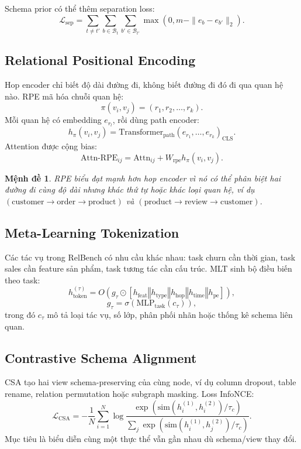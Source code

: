 \documentclass[12pt,a4paper]{article}
\newtheorem{proposition}{Mệnh đề}[section]
\newcommand{\concat}{\mathbin{\Vert}}
\begin{document}
Schema prior có thể thêm separation loss:
\[
  \mathcal{L}_\text{sep}=
  \sum_{t\ne t'}\sum_{b\in\mathcal{B}_t}\sum_{b'\in\mathcal{B}_{t'}}
  \max(0,m-\|e_b-e_{b'}\|_2).
\]

\subsection{Relational Positional Encoding}

Hop encoder chỉ biết độ dài đường đi, không biết đường đi đó đi qua quan hệ
nào. RPE mã hóa chuỗi quan hệ:
\[
  \pi(v_i,v_j)=(r_1,r_2,\ldots,r_k).
\]
Mỗi quan hệ có embedding $e_{r_l}$, rồi dùng path encoder:
\[
  h_\pi(v_i,v_j)=
  \text{Transformer}_\text{path}(e_{r_1},\ldots,e_{r_k})_{\text{CLS}}.
\]
Attention được cộng bias:
\[
  \text{Attn-RPE}_{ij}=\text{Attn}_{ij}+W_\text{rpe}h_\pi(v_i,v_j).
\]

\begin{proposition}
RPE biểu đạt mạnh hơn hop encoder vì nó có thể phân biệt hai đường đi cùng
độ dài nhưng khác thứ tự hoặc khác loại quan hệ, ví dụ
$(\text{customer}\rightarrow\text{order}\rightarrow\text{product})$ và
$(\text{product}\rightarrow\text{review}\rightarrow\text{customer})$.
\end{proposition}

\subsection{Meta-Learning Tokenization}

Các tác vụ trong RelBench có nhu cầu khác nhau: task churn cần thời gian,
task sales cần feature sản phẩm, task tương tác cần cấu trúc. MLT sinh bộ
điều biến theo task:
\[
  h_\text{token}^{(\tau)}=
  O\left(g_\tau\odot
  [h_\text{feat}\concat h_\text{type}\concat h_\text{hop}
  \concat h_\text{time}\concat h_\text{pe}]\right),
\]
\[
  g_\tau=\sigma(\text{MLP}_\text{task}(c_\tau)),
\]
trong đó $c_\tau$ mô tả loại tác vụ, số lớp, phân phối nhãn hoặc thống kê
schema liên quan.

\subsection{Contrastive Schema Alignment}

CSA tạo hai view schema-preserving của cùng node, ví dụ column dropout, table
rename, relation permutation hoặc subgraph masking. Loss InfoNCE:
\[
  \mathcal{L}_\text{CSA}=
  -\frac{1}{N}\sum_{i=1}^{N}
  \log
  \frac{\exp(\text{sim}(h_i^{(1)},h_i^{(2)})/\tau_c)}
  {\sum_j\exp(\text{sim}(h_i^{(1)},h_j^{(2)})/\tau_c)}.
\]
Mục tiêu là biểu diễn cùng một thực thể vẫn gần nhau dù schema/view thay đổi.
\end{document}
